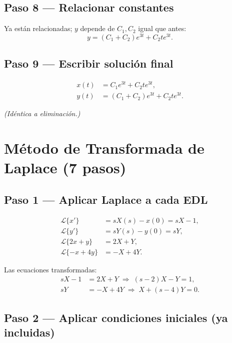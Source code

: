 \documentclass[10pt,a4paper]{article}
\begin{document}
\subsection{Paso 8 --- Relacionar constantes}

Ya están relacionadas; \(y\) depende de \(C_{1}, C_{2}\) igual que antes:
\[
y = (C_{1} + C_{2}) e^{3t} + C_{2} t e^{3t}.
\]

\subsection{Paso 9 --- Escribir solución final}
\[
\boxed{
\begin{aligned}
x(t) &= C_{1} e^{3t} + C_{2} t e^{3t},\\[2pt]
y(t) &= (C_{1} + C_{2}) e^{3t} + C_{2} t e^{3t}.
\end{aligned}
}
\]

\smallskip
\noindent\textit{(Idéntica a eliminación.)}

\section{Método de Transformada de Laplace (7 pasos)}

\subsection{Paso 1 --- Aplicar Laplace a cada EDL}
\[
\begin{aligned}
\mathcal{L}\{x'\} &= sX(s) - x(0) = sX - 1,\\
\mathcal{L}\{y'\} &= sY(s) - y(0) = sY,\\
\mathcal{L}\{2x + y\} &= 2X + Y,\\
\mathcal{L}\{-x + 4y\} &= -X + 4Y.
\end{aligned}
\]

Las ecuaciones transformadas:
\[
\begin{aligned}
sX - 1 &= 2X + Y \;\Longrightarrow\; (s - 2)X - Y = 1,\\
sY    &= -X + 4Y \;\Longrightarrow\; X + (s - 4)Y = 0.
\end{aligned}
\]

\subsection{Paso 2 --- Aplicar condiciones iniciales (ya incluidas)}
\end{document}
